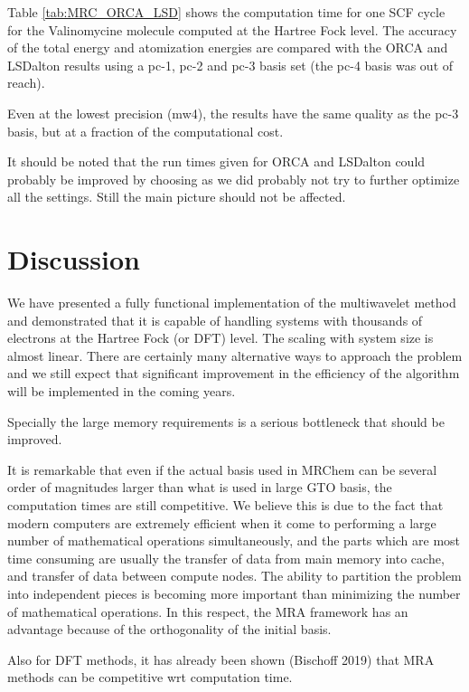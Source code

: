 \documentclass{article}
\begin{document}
Table \ref{tab:MRC_ORCA_LSD} shows the computation time for one SCF cycle for the Valinomycine molecule computed at the Hartree Fock level. The accuracy of the total energy and atomization energies are compared with the ORCA and LSDalton
results using a pc-1, pc-2 and pc-3 basis set (the pc-4 basis was out of reach). 

Even at the lowest precision (mw4), the results have the same quality as the pc-3 basis, but at a fraction of the computational cost. 

It should be noted that the run times given for ORCA and LSDalton could probably be improved by choosing as we did probably not try to further optimize all the settings. Still the main picture should not be affected.





\section{Discussion}
We have presented a fully functional implementation of the multiwavelet method and demonstrated that it is capable of handling systems with thousands of electrons at the Hartree Fock (or DFT) level. The scaling with system size is almost linear. There are certainly many alternative ways to approach the problem and we still expect that significant improvement in the efficiency of the algorithm will be implemented in the coming years. 

Specially the large memory requirements is a serious bottleneck that should be improved. %

It is remarkable that even if the actual basis used in MRChem can be several order of magnitudes larger than what is used in large GTO basis, the computation times are still competitive. We believe this is due to the fact that modern computers are extremely efficient when it come to performing a large number of mathematical operations simultaneously, and the parts which are most time consuming are usually the transfer of data from main memory into cache, and transfer of data between compute nodes. The ability to partition the problem into independent pieces is becoming more important than minimizing the number of mathematical operations. In this respect, the MRA framework has an advantage because of the orthogonality of the initial basis.

Also for DFT methods, it has already been shown (Bischoff 2019) that MRA methods can be competitive wrt computation time.
\end{document}
